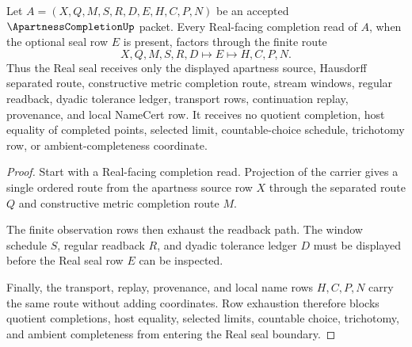 \begin{theorem}
\label{thm:apartness-completion-real-seal-boundary}
Let $A=(X,Q,M,S,R,D,E,H,C,P,N)$ be an accepted $\ApartnessCompletionUp$ packet. Every Real-facing completion read of $A$, when the optional seal row $E$ is present, factors through the finite route
$$
X,Q,M,S,R,D \longmapsto E \longmapsto H,C,P,N .
$$
Thus the Real seal receives only the displayed apartness source, Hausdorff separated route, constructive metric completion route, stream windows, regular readback, dyadic tolerance ledger, transport rows, continuation replay, provenance, and local NameCert row. It receives no quotient completion, host equality of completed points, selected limit, countable-choice schedule, trichotomy row, or ambient-completeness coordinate.
\end{theorem}
\begin{proof}
Start with a Real-facing completion read. Projection of the carrier gives a single ordered route from the apartness source row $X$ through the separated route $Q$ and constructive metric completion route $M$.

The finite observation rows then exhaust the readback path. The window schedule $S$, regular readback $R$, and dyadic tolerance ledger $D$ must be displayed before the Real seal row $E$ can be inspected.

Finally, the transport, replay, provenance, and local name rows $H,C,P,N$ carry the same route without adding coordinates. Row exhaustion therefore blocks quotient completions, host equality, selected limits, countable choice, trichotomy, and ambient completeness from entering the Real seal boundary.
\end{proof}


\begin{closurestatus}{\ApartnessCompletionUp}
  \theoryclosure{\seedClosure}
  \formalstatus{\unformalizedV}
\end{closurestatus}
